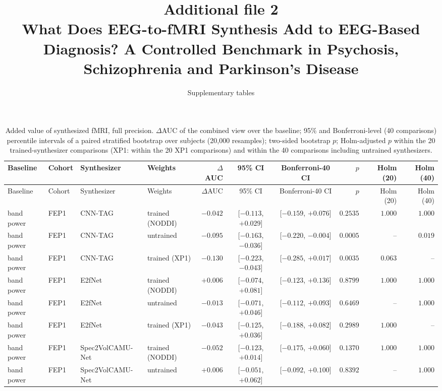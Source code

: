 \documentclass[10pt]{article}
\title{Additional file 2\\[4pt]\large What Does EEG-to-fMRI Synthesis Add to EEG-Based Diagnosis? A Controlled Benchmark in Psychosis, Schizophrenia and Parkinson's Disease}
\author{\normalsize Supplementary tables}
\date{}
\begin{document}
\maketitle

\footnotesize
\begin{longtable}{l l l l r c c r r r}
\caption{Added value of synthesized fMRI, full precision. $\Delta$AUC of the combined view over the baseline; 95\% and Bonferroni-level (40 comparisons) percentile intervals of a paired stratified bootstrap over subjects (20,000 resamples); two-sided bootstrap $p$; Holm-adjusted $p$ within the 20 trained-synthesizer comparisons (XP1: within the 20 XP1 comparisons) and within the 40 comparisons including untrained synthesizers.}\label{tab:s_delta}\\
\toprule
Baseline & Cohort & Synthesizer & Weights & $\Delta$AUC & 95\% CI & Bonferroni-40 CI & $p$ & Holm (20) & Holm (40) \\
\midrule
\endfirsthead
\toprule
Baseline & Cohort & Synthesizer & Weights & $\Delta$AUC & 95\% CI & Bonferroni-40 CI & $p$ & Holm (20) & Holm (40) \\
\midrule
\endhead
        band power & FEP1 & CNN-TAG & trained (NODDI) & $-0.042$ & [$-0.113$, $+0.029$] & [$-0.159$, $+0.076$] & $0.2535$ & $1.000$ & $1.000$ \\
        band power & FEP1 & CNN-TAG & untrained & $-0.095$ & [$-0.163$, $-0.036$] & [$-0.220$, $-0.004$] & $0.0005$ & -- & $0.019$ \\
        band power & FEP1 & CNN-TAG & trained (XP1) & $-0.130$ & [$-0.223$, $-0.043$] & [$-0.285$, $+0.017$] & $0.0035$ & $0.063$ & -- \\
        band power & FEP1 & E2fNet & trained (NODDI) & $+0.006$ & [$-0.074$, $+0.081$] & [$-0.123$, $+0.136$] & $0.8799$ & $1.000$ & $1.000$ \\
        band power & FEP1 & E2fNet & untrained & $-0.013$ & [$-0.071$, $+0.046$] & [$-0.112$, $+0.093$] & $0.6469$ & -- & $1.000$ \\
        band power & FEP1 & E2fNet & trained (XP1) & $-0.043$ & [$-0.125$, $+0.036$] & [$-0.188$, $+0.082$] & $0.2989$ & $1.000$ & -- \\
        band power & FEP1 & Spec2VolCAMU-Net & trained (NODDI) & $-0.052$ & [$-0.123$, $+0.014$] & [$-0.175$, $+0.060$] & $0.1370$ & $1.000$ & $1.000$ \\
        band power & FEP1 & Spec2VolCAMU-Net & untrained & $+0.006$ & [$-0.051$, $+0.062$] & [$-0.092$, $+0.100$] & $0.8392$ & -- & $1.000$ \\

\end{longtable}
\end{document}

